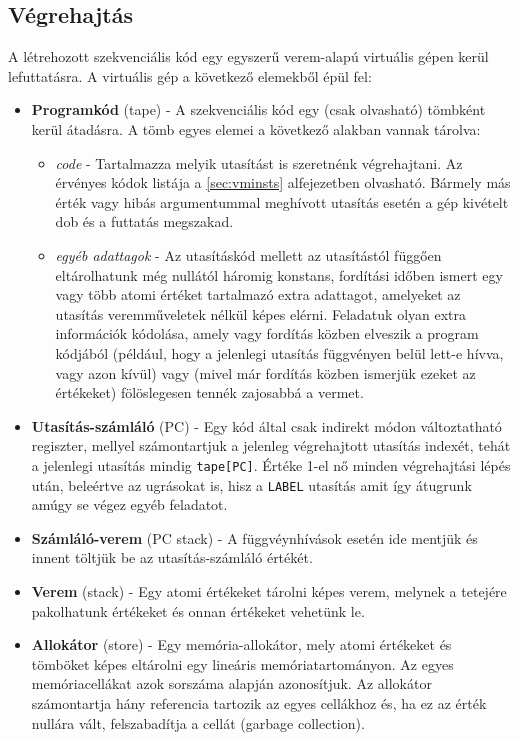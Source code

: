 \subsection{Végrehajtás}

A létrehozott szekvenciális kód egy egyszerű verem-alapú virtuális gépen kerül lefuttatásra. A virtuális gép a következő elemekből épül fel:

\begin{itemize}
        \item \textbf{Programkód} (tape) - A szekvenciális kód egy (csak olvasható) tömbként kerül átadásra. A tömb egyes elemei a következő alakban vannak tárolva:
        \begin{itemize}
            \item \textit{code} - Tartalmazza melyik utasítást is szeretnénk végrehajtani. Az érvényes kódok listája a \ref{sec:vminsts} alfejezetben olvasható. Bármely más érték vagy hibás argumentummal meghívott utasítás esetén a gép kivételt dob és a futtatás megszakad.
            \item \textit{egyéb adattagok} - Az utasításkód mellett az utasítástól függően eltárolhatunk még nullától háromig konstans, fordítási időben ismert egy vagy több atomi értéket tartalmazó extra adattagot, amelyeket az utasítás veremműveletek nélkül képes elérni. Feladatuk olyan extra információk kódolása, amely vagy fordítás közben elveszik a program kódjából (például, hogy a jelenlegi utasítás függvényen belül lett-e hívva, vagy azon kívül) vagy (mivel már fordítás közben ismerjük ezeket az értékeket) fölöslegesen tennék zajosabbá a vermet.
        \end{itemize}
        \item \textbf{Utasítás-számláló} (PC) - Egy kód által csak indirekt módon változtatható regiszter, mellyel számontartjuk a jelenleg végrehajtott utasítás indexét, tehát a jelenlegi utasítás mindig \texttt{tape[PC]}. Értéke 1-el nő minden végrehajtási lépés után, beleértve az ugrásokat is, hisz a \texttt{LABEL} utasítás amit így átugrunk amúgy se végez egyéb feladatot.
        \item \textbf{Számláló-verem} (PC stack) - A függvéynhívások esetén ide mentjük és innent töltjük be az utasítás-számláló értékét.
        \item \textbf{Verem} (stack) - Egy atomi értékeket tárolni képes verem, melynek a tetejére pakolhatunk értékeket és onnan értékeket vehetünk le.
        \item \textbf{Allokátor} (store) - Egy memória-allokátor, mely atomi értékeket és tömböket képes eltárolni egy lineáris memóriatartományon. Az egyes memóriacellákat azok sorszáma alapján azonosítjuk. Az allokátor számontartja hány referencia tartozik az egyes cellákhoz és, ha ez az érték nullára vált, felszabadítja a cellát (garbage collection).

\end{itemize}
